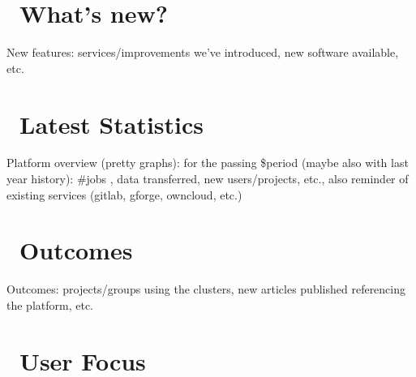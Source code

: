 \documentclass[a4paper]{article}
\begin{document}
\ulhpctoc

\begin{welcome}
  \lipsum[1]
\end{welcome}



\section{\faBullhorn\ What's new?}

New features: services/improvements we've introduced, new software
available, etc.

\section{\faBarChart\ Latest Statistics}

Platform overview (pretty graphs): for the passing \$period (maybe also
with last year history): \#jobs , data transferred,  new users/projects,
etc., also reminder of existing services (gitlab, gforge, owncloud, etc.)

\section{\faShare\ Outcomes}

Outcomes: projects/groups using the clusters, new articles published
referencing the platform, etc.

\section{\faUser\ User Focus}
\end{document}

